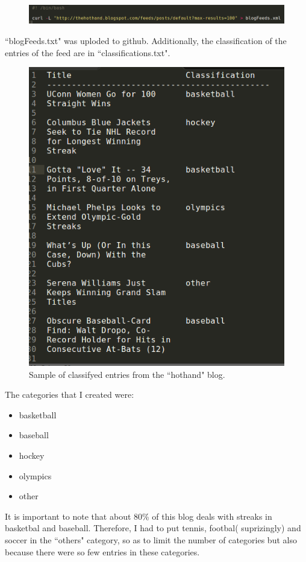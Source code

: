 \documentclass{article}
\begin{document}
\begin{figure} [H]
 \centering
 \includegraphics[width=\linewidth]{getblog.png}
\end{figure}

``blogFeeds.txt" was uploded to github. Additionally, the classification of the entries of the feed are in ``classifications.txt".

\begin{figure} [H]
 \centering
 \includegraphics[height = 10 cm]{classifications.png}
 \caption{Sample of classifyed entries from the ``hothand" blog. }
\end{figure}

The categories that I created were:

\begin{itemize}
  \item   basketball
  \item   baseball
  \item   hockey
  \item   olympics
  \item   other
\end{itemize}

It is important to note that about 80\% of this blog deals with streaks in basketbal and baseball. Therefore, I had to put tennis, footbal( suprizingly) and soccer in the ``others" category, so as to limit the number of categories but also because there were so few entries in these categories.
\end{document}
